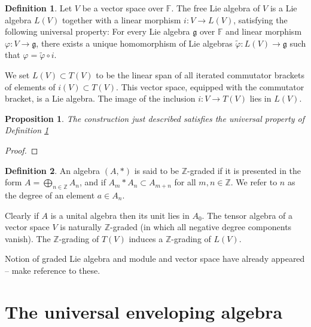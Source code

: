 \documentclass[12pt]{article}
\theoremstyle{plain}
\newtheorem{prop}[thm]{Proposition}
\theoremstyle{definition}
\newtheorem{defn}{Definition}[section]
\numberwithin{equation}{section}
\newcommand{\F}{\mathbb{F}}
\newcommand{\Z}{\mathbb{Z}}
\newcommand{\g}{\mathfrak{g}}
\begin{document}
\begin{defn}\label{defn:L(V).univ}
Let $V$ be a vector space over $\F$. The free Lie algebra of $V$ is a Lie algebra $L(V)$ together with a linear morphism $i : V \rightarrow L(V)$, satisfying the following universal property: For every Lie algebra $\g$ over $\F$ and linear morphism $\varphi : V \rightarrow \g$, there exists a unique homomorphism of Lie algebras $\widetilde\varphi : L(V) \rightarrow \g$ such that $\varphi = \widetilde\varphi \circ i$.
\end{defn}
We set $L(V) \subset T(V)$ to be the linear span of all iterated commutator brackets of elements of $i(V) \subset T(V)$. This vector space, equipped with the commutator bracket, is a Lie algebra. The image of the inclusion $i : V \rightarrow T(V)$ lies in $L(V)$.
\begin{prop}
The construction just described satisfies the universal property of Definition \ref{defn:L(V).univ}
\end{prop}

\begin{proof}

\end{proof}

\begin{defn}
An algebra $(A, *)$ is said to be $\Z$-graded if it is presented in the form $A = \bigoplus_{n \in \Z} A_n$, and if $A_m * A_n \subset A_{m+n}$ for all $m, n \in \Z$. We refer to $n$ as the degree of an element $a \in A_n$.
\end{defn}
Clearly if $A$ is a unital algebra then its unit lies in $A_0$. The tensor algebra of a vector space $V$ is naturally $\Z$-graded (in which all negative degree components vanish). The $\Z$-grading of $T(V)$ induces a $\Z$-grading of $L(V)$.

{\color{red}Notion of graded Lie algebra and module and vector space have already appeared -- make reference to these.}




\section{The universal enveloping algebra}
\end{document}
